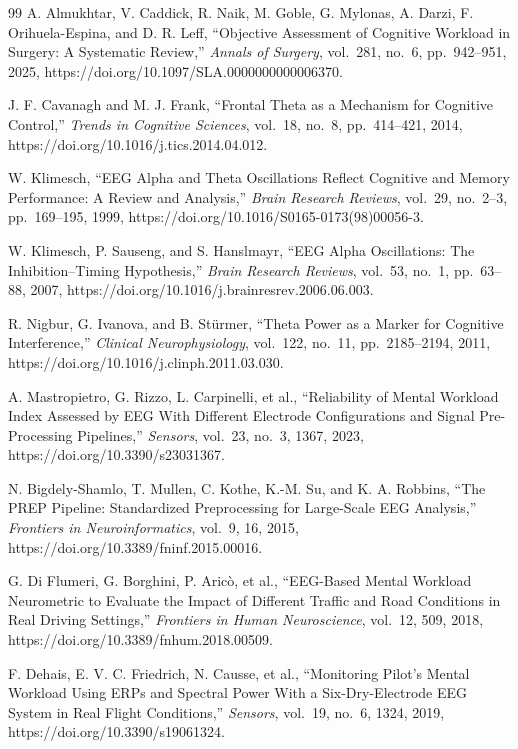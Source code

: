 \documentclass[10pt]{iopart}
\begin{document}
\begin{thebibliography}{99}
A. Almukhtar, V. Caddick, R. Naik, M. Goble, G. Mylonas, A. Darzi,
F. Orihuela-Espina, and D. R. Leff,
``Objective Assessment of Cognitive Workload in Surgery: A Systematic
Review,''
\textit{Annals of Surgery}, vol.~281, no.~6, pp.~942--951, 2025,
https://doi.org/10.1097/SLA.0000000000006370.

J. F. Cavanagh and M. J. Frank, ``Frontal Theta as a Mechanism for
Cognitive Control,''
\textit{Trends in Cognitive Sciences}, vol.~18, no.~8, pp.~414--421, 2014,
https://doi.org/10.1016/j.tics.2014.04.012.

W. Klimesch, ``EEG Alpha and Theta Oscillations Reflect Cognitive
and Memory Performance: A Review and Analysis,''
\textit{Brain Research Reviews}, vol.~29, no.~2--3, pp.~169--195, 1999,
https://doi.org/10.1016/S0165-0173(98)00056-3.

W. Klimesch, P. Sauseng, and S. Hanslmayr, ``EEG Alpha Oscillations:
The Inhibition--Timing Hypothesis,''
\textit{Brain Research Reviews}, vol.~53, no.~1, pp.~63--88, 2007,
https://doi.org/10.1016/j.brainresrev.2006.06.003.

R. Nigbur, G. Ivanova, and B. St\"{u}rmer,
``Theta Power as a Marker for Cognitive Interference,''
\textit{Clinical Neurophysiology}, vol.~122, no.~11, pp.~2185--2194, 2011,
https://doi.org/10.1016/j.clinph.2011.03.030.

A. Mastropietro, G. Rizzo, L. Carpinelli, et al.,
``Reliability of Mental Workload Index Assessed by EEG With Different
Electrode Configurations and Signal Pre-Processing Pipelines,''
\textit{Sensors}, vol.~23, no.~3, 1367, 2023,
https://doi.org/10.3390/s23031367.

N. Bigdely-Shamlo, T. Mullen, C. Kothe, K.-M. Su, and K. A. Robbins,
``The PREP Pipeline: Standardized Preprocessing for Large-Scale EEG
Analysis,''
\textit{Frontiers in Neuroinformatics}, vol.~9, 16, 2015,
https://doi.org/10.3389/fninf.2015.00016.

G. Di Flumeri, G. Borghini, P. Aric\`{o}, et al.,
``EEG-Based Mental Workload Neurometric to Evaluate the Impact of
Different Traffic and Road Conditions in Real Driving Settings,''
\textit{Frontiers in Human Neuroscience}, vol.~12, 509, 2018,
https://doi.org/10.3389/fnhum.2018.00509.

F. Dehais, E. V. C. Friedrich, N. Causse, et al.,
``Monitoring Pilot's Mental Workload Using ERPs and Spectral Power
With a Six-Dry-Electrode EEG System in Real Flight Conditions,''
\textit{Sensors}, vol.~19, no.~6, 1324, 2019,
https://doi.org/10.3390/s19061324.

\end{thebibliography}
\end{document}
